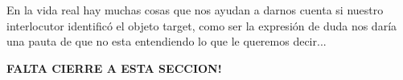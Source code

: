 En la vida real hay muchas cosas que nos ayudan a darnos cuenta si nuestro interlocutor identific\'o el objeto target, como ser la expresi\'on de duda nos dar\'ia una pauta de que no esta entendiendo lo que le queremos decir...

\textbf{FALTA CIERRE A ESTA SECCION!}

%



